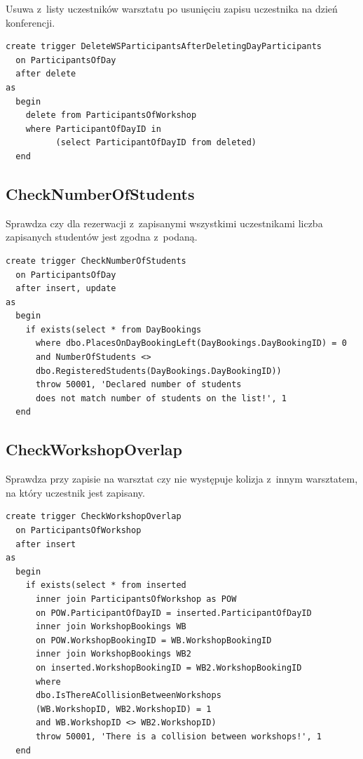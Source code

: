 \documentclass[12pt, a4paper]{mwrep}
\begin{document}
\noindent Usuwa z~listy uczestników warsztatu po usunięciu zapisu uczestnika na dzień konferencji.

\begin{lstlisting}
create trigger DeleteWSParticipantsAfterDeletingDayParticipants
  on ParticipantsOfDay
  after delete
as
  begin
    delete from ParticipantsOfWorkshop
    where ParticipantOfDayID in
          (select ParticipantOfDayID from deleted)
  end
\end{lstlisting}

\subsection{CheckNumberOfStudents}

\noindent Sprawdza czy dla rezerwacji z~zapisanymi wszystkimi uczestnikami liczba zapisanych studentów jest zgodna z~podaną.

\begin{lstlisting}
create trigger CheckNumberOfStudents
  on ParticipantsOfDay
  after insert, update
as
  begin
    if exists(select * from DayBookings
      where dbo.PlacesOnDayBookingLeft(DayBookings.DayBookingID) = 0
      and NumberOfStudents <> 
      dbo.RegisteredStudents(DayBookings.DayBookingID))
      throw 50001, 'Declared number of students 
      does not match number of students on the list!', 1
  end
\end{lstlisting}

\subsection{CheckWorkshopOverlap}

\noindent Sprawdza przy zapisie na warsztat czy nie występuje kolizja z~innym warsztatem, na który uczestnik jest zapisany.

\begin{lstlisting}
create trigger CheckWorkshopOverlap
  on ParticipantsOfWorkshop
  after insert
as
  begin
    if exists(select * from inserted
      inner join ParticipantsOfWorkshop as POW
      on POW.ParticipantOfDayID = inserted.ParticipantOfDayID
      inner join WorkshopBookings WB 
      on POW.WorkshopBookingID = WB.WorkshopBookingID
      inner join WorkshopBookings WB2 
      on inserted.WorkshopBookingID = WB2.WorkshopBookingID
      where 
      dbo.IsThereACollisionBetweenWorkshops
      (WB.WorkshopID, WB2.WorkshopID) = 1
      and WB.WorkshopID <> WB2.WorkshopID)
      throw 50001, 'There is a collision between workshops!', 1
  end
\end{lstlisting}
\end{document}
